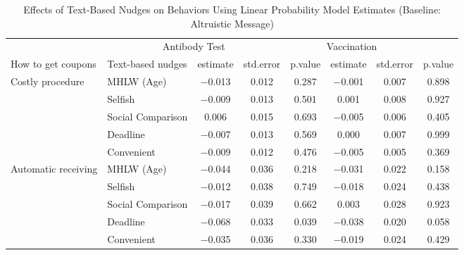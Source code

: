 \begin{table}

\caption{Effects of Text-Based Nudges on Behaviors Using Linear Probability Model Estimates (Baseline: Altruistic Message) \label{tab:act-reg-ftest2}}
\centering
\begin{tabular}[t]{>{\raggedright\arraybackslash}p{5em}lcccccc}
\toprule
\multicolumn{2}{c}{ } & \multicolumn{3}{c}{Antibody Test} & \multicolumn{3}{c}{Vaccination} \\
\cmidrule(l{3pt}r{3pt}){3-5} \cmidrule(l{3pt}r{3pt}){6-8}
How to get coupons & Text-based nudges & estimate & std.error & p.value & estimate  & std.error  & p.value \\
\midrule
Costly procedure & MHLW (Age) & \num{-0.013} & \num{0.012} & \num{0.287} & \num{-0.001} & \num{0.007} & \num{0.898}\\
 & Selfish & \num{-0.009} & \num{0.013} & \num{0.501} & \num{0.001} & \num{0.008} & \num{0.927}\\
 & Social Comparison & \num{0.006} & \num{0.015} & \num{0.693} & \num{-0.005} & \num{0.006} & \num{0.405}\\
 & Deadline & \num{-0.007} & \num{0.013} & \num{0.569} & \num{0.000} & \num{0.007} & \num{0.999}\\
 & Convenient & \num{-0.009} & \num{0.012} & \num{0.476} & \num{-0.005} & \num{0.005} & \num{0.369}\\
Automatic receiving & MHLW (Age) & \num{-0.044} & \num{0.036} & \num{0.218} & \num{-0.031} & \num{0.022} & \num{0.158}\\
 & Selfish & \num{-0.012} & \num{0.038} & \num{0.749} & \num{-0.018} & \num{0.024} & \num{0.438}\\
 & Social Comparison & \num{-0.017} & \num{0.039} & \num{0.662} & \num{0.003} & \num{0.028} & \num{0.923}\\
 & Deadline & \num{-0.068} & \num{0.033} & \num{0.039} & \num{-0.038} & \num{0.020} & \num{0.058}\\
 & Convenient & \num{-0.035} & \num{0.036} & \num{0.330} & \num{-0.019} & \num{0.024} & \num{0.429}\\
\bottomrule
\end{tabular}
\end{table}
